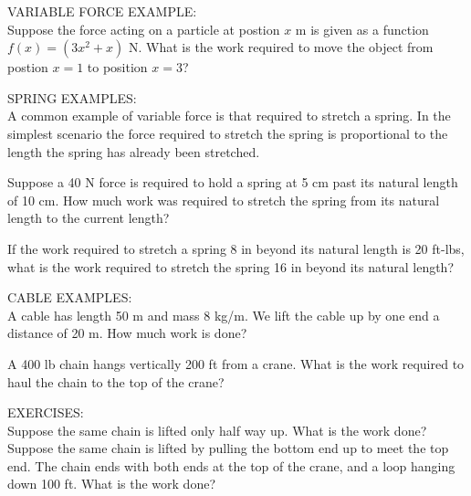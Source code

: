 \documentclass[11pt]{article}
\begin{document}
VARIABLE FORCE EXAMPLE:\\

Suppose the force acting on a particle at postion $x$ m is given as a function $f(x) = (3x^2+x)$ N.  What is the work required to move the object from postion $x=1$ to position $x=3$?

\pagebreak


SPRING EXAMPLES:\\

A common example of variable force is that required to stretch a spring.  In the simplest scenario the force required to stretch the spring is
proportional to the length the spring has already been stretched.  \\

\vspace{2in}

Suppose a 40 N force is required to hold a spring at 5 cm past its natural length of 10 cm.  How much work was required to stretch the spring
from its natural length to the current length?

\vspace{3in}

If the work required to stretch a spring 8 in beyond its natural length is 20 ft-lbs, what is the work required to stretch the spring 16 in beyond its natural length?

\pagebreak

CABLE EXAMPLES:\\

A cable has length 50 m and mass 8 kg/m.  We lift the cable up by one end a distance of 20 m.  How much work is done?\\


\vspace{3in}

A 400 lb chain hangs vertically 200 ft from a crane.  What is the work required to haul the chain to the top of the crane?\\

\vspace{3in}


EXERCISES:\\

Suppose the same chain is lifted only half way up.  What is the work done?\\

Suppose the same chain is lifted by pulling the bottom end up to meet the top end.  The chain ends with both ends at the top of the crane,
and a loop hanging down 100 ft.  What is the work done?\\
\end{document}
